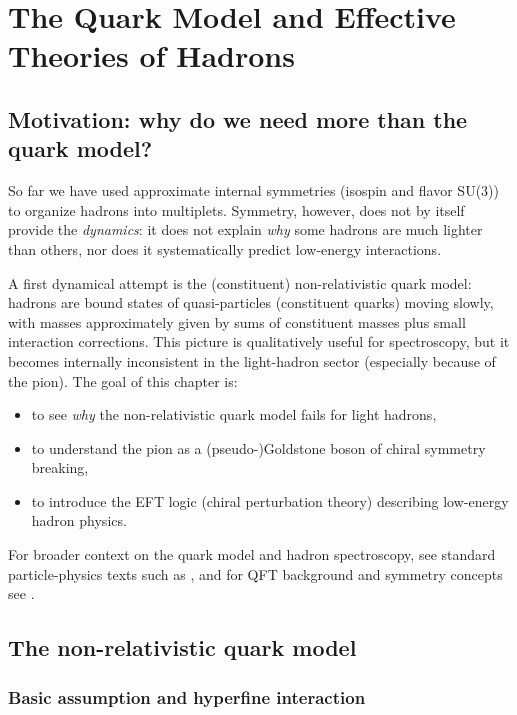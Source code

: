 
\chapter{The Quark Model and Effective Theories of Hadrons}
\label{ch:quark_model_eft}

\section{Motivation: why do we need more than the quark model?}

So far we have used approximate internal symmetries (isospin and flavor SU(3))
to organize hadrons into multiplets. Symmetry, however, does not by itself provide
the \emph{dynamics}: it does not explain \emph{why} some hadrons are much lighter than others,
nor does it systematically predict low-energy interactions.

A first dynamical attempt is the (constituent) non-relativistic quark model:
hadrons are bound states of quasi-particles (constituent quarks) moving slowly,
with masses approximately given by sums of constituent masses plus small interaction corrections.
This picture is qualitatively useful for spectroscopy, but it becomes internally inconsistent
in the light-hadron sector (especially because of the pion).
The goal of this chapter is:
\begin{itemize}
  \item to see \emph{why} the non-relativistic quark model fails for light hadrons,
  \item to understand the pion as a (pseudo-)Goldstone boson of chiral symmetry breaking,
  \item to introduce the EFT logic (chiral perturbation theory) describing low-energy hadron physics.
\end{itemize}

For broader context on the quark model and hadron spectroscopy, see
standard particle-physics texts such as \citep{halzen1984,griffiths2008,thomson2013},
and for QFT background and symmetry concepts see \citep{peskin1995,schwartz2014,weinberg1995qtf1}.

\section{The non-relativistic quark model}

\subsection{Basic assumption and hyperfine interaction}

